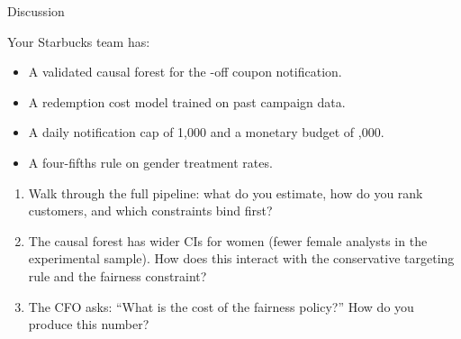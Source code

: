 \documentclass[aspectratio=169, 11pt, handout]{beamer}
\begin{document}
 
\begin{frame}{Discussion}
 
Your Starbucks team has:
\begin{itemize}
    \item A validated causal forest for the -off coupon notification.
    \item A redemption cost model trained on past campaign data.
    \item A daily notification cap of 1,000 and a monetary budget of ,000.
    \item A four-fifths rule on gender treatment rates.
\end{itemize}
 
\bigskip
 
\begin{enumerate}
    \item Walk through the full pipeline: what do you estimate, how do you rank customers, and which constraints bind first?
 
    \pause
    \bigskip
 
    \item The causal forest has wider CIs for women (fewer female analysts in the experimental sample). How does this interact with the conservative targeting rule and the fairness constraint?
 
    \pause
    \bigskip
 
    \item The CFO asks: ``What is the cost of the fairness policy?'' How do you produce this number?
\end{enumerate}
 
\end{frame}
 
\end{document}
